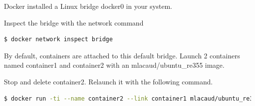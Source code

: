 \documentclass[a4paper,11pt]{exam}
\begin{document}
      
\begin{questions}

	\question Docker installed a Linux bridge docker0 in your system. 
	
	\question Inspect the bridge with the network command

		\begin{lstlisting}[frame=single,language={sh}]
$ docker network inspect bridge
		\end{lstlisting}

	By default, containers are attached to this default bridge. Launch 2 containers named container1 and container2 with an mlacaud/ubuntu\_re355 image.
	
	\question Stop and delete container2. Relaunch it with the following command.

		\begin{lstlisting}[frame=single,language={sh}]
$ docker run -ti --name container2 --link container1 mlacaud/ubuntu_re355
		\end{lstlisting}	
		\begin{parts}

\end{parts}
\end{questions}
\end{document}
